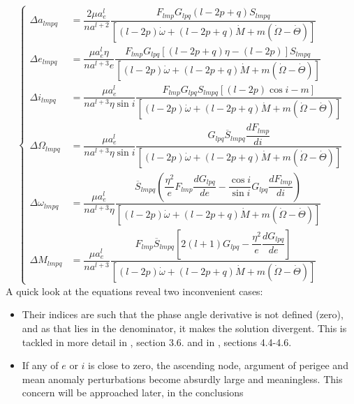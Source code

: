 				\begin{equation}
				\left\{ \begin{array}{llll}
				\Delta a_{lmpq} 		& = \dfrac{2\mu a_e^l}{na^{l+2}} \dfrac{F_{lmp} G_{lpq} (l - 2p + q)  S_{lmpq}}{\left[(l - 2p) \dot{\omega} + (l - 2p + q) \dot{M} + m \left( \dot{\Omega}  - \dot{\Theta}\right)\right]} \\[1.5 em]
				\Delta e_{lmpq} 		& = \dfrac{\mu a_e^l \eta}{na^{l + 3} e} \dfrac{F_{lmp} G_{lpq} \left[ \left( l - 2p + q\right) \eta - \left(l - 2p\right)\right] S_{lmpq}}{\left[(l - 2p) \dot{\omega} + (l - 2p + q) \dot{M} + m \left( \dot{\Omega}  - \dot{\Theta}\right)\right]} \\[1.5 em]
				\Delta i_{lmpq} 		& = \dfrac{\mu a_e^l}{na^{l + 3} \eta \sin i}\dfrac{F_{lmp} G_{lpq} S_{lmpq} \left[ \left( l - 2p \right) \cos i - m\right]}{\left[(l - 2p) \dot{\omega} + (l - 2p + q) \dot{M} + m \left( \dot{\Omega}  - \dot{\Theta}\right)\right]} \\[1.5 em]
				\Delta \Omega_{lmpq} 	& = \dfrac{\mu a_e^l}{na^{l + 3} \eta \sin i} \dfrac{G_{lpq} \overline{S}_{lmpq}\dfrac{ dF_{lmp} }{di}}{\left[ (l - 2p)\dot{\omega} + (l - 2p + q) \dot{M} + m \left( \dot{\Omega}  - \dot{\Theta}\right) \right]} \\[1.5 em]
				\Delta \omega_{lmpq}	& = \dfrac{\mu a_e^l}{na^{l + 3} \eta } \dfrac{\overline{S}_{lmpq} \left( \dfrac{\eta^2}{e} F_{lmp} \dfrac{d G_{lpq}}{d e} - \dfrac{\cos i}{\sin i} G_{lpq} \dfrac{dF_{lmp}}{di} \right)}{\left[ (l - 2p)\dot{\omega} + (l - 2p + q) \dot{M} + m \left( \dot{\Omega}  - \dot{\Theta}\right) \right]}\\[1.5 em]
				\Delta M_{lmpq}		& = \dfrac{\mu a_e^l}{n a^{l + 3}}\dfrac{F_{lmp} \overline{S}_{lmpq} \left[2(l+1)G_{lpq} - \dfrac{\eta^2}{e} \dfrac{dG_{lpq}}{de}\right] }{\left[ (l - 2p)\dot{\omega} + (l - 2p + q) \dot{M} + m \left( \dot{\Omega}  - \dot{\Theta}\right) \right]}
				\end{array}\right.
				\label{eq:LPE_int}
				\end{equation}
				\indent A quick look at the equations reveal two inconvenient cases:
				\begin{itemize}
				\item[\GMVred{I.}]  Their indices are such that the phase angle derivative is not defined (zero), and as that lies in the denominator, it makes the solution divergent. This is tackled in more detail in \cite{Kaula}, section 3.6.  and in \cite{Chao}, sections 4.4-4.6.
				\item[\GMVred{II.}]  If any of $e$ or $i$ is close to zero, the ascending node, argument of perigee and mean anomaly perturbations become absurdly large and meaningless. This concern will be approached later, in the conclusions
				\end{itemize}
